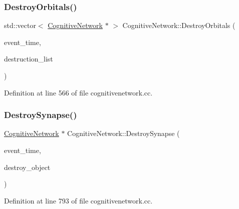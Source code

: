 \subsubsection{\texorpdfstring{Destroy\+Orbitals()}{DestroyOrbitals()}}
{\footnotesize\ttfamily std\+::vector$<$ \mbox{\hyperlink{class_cognitive_network}{Cognitive\+Network}} $\ast$ $>$ Cognitive\+Network\+::\+Destroy\+Orbitals (\begin{DoxyParamCaption}\item[{std\+::chrono\+::time\+\_\+point$<$ \mbox{\hyperlink{universe_8h_a0ef8d951d1ca5ab3cfaf7ab4c7a6fd80}{Clock}} $>$}]{event\+\_\+time,  }\item[{std\+::vector$<$ \mbox{\hyperlink{class_cognitive_network}{Cognitive\+Network}} $\ast$$>$}]{destruction\+\_\+list }\end{DoxyParamCaption})}



Definition at line 566 of file cognitivenetwork.\+cc.

\mbox{\label{class_cognitive_network_a08b87aa9a0823355ef7cef77414dc6dc}} 
\subsubsection{\texorpdfstring{Destroy\+Synapse()}{DestroySynapse()}}
{\footnotesize\ttfamily \mbox{\hyperlink{class_cognitive_network}{Cognitive\+Network}} $\ast$ Cognitive\+Network\+::\+Destroy\+Synapse (\begin{DoxyParamCaption}\item[{std\+::chrono\+::time\+\_\+point$<$ \mbox{\hyperlink{universe_8h_a0ef8d951d1ca5ab3cfaf7ab4c7a6fd80}{Clock}} $>$}]{event\+\_\+time,  }\item[{\mbox{\hyperlink{class_cognitive_network}{Cognitive\+Network}} $\ast$}]{destroy\+\_\+object }\end{DoxyParamCaption})}



Definition at line 793 of file cognitivenetwork.\+cc.

\mbox{\label{class_cognitive_network_a141e9e8e6337d42fc19edd75bb50e47b}} 
